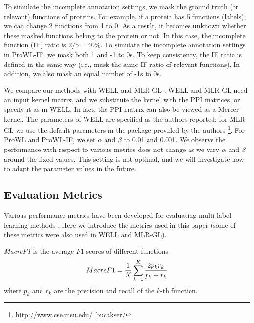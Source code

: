 \documentclass{llncs} %
\begin{document}
To simulate the incomplete annotation settings, we mask the ground truth (or relevant) functions of proteins. For example, if a protein has 5 functions (labels), we can change
2 functions from 1 to 0. As a result, it becomes unknown  whether these masked functions belong to the protein or not. In this case, the incomplete function (IF) ratio is $2/5=40\%$. To
simulate the incomplete annotation settings in ProWL-IF, we mask both 1 and -1 to 0s. To keep consistency, the IF ratio is defined in the same way (i.e., mask the
same IF ratio of relevant functions). In addition, we also mask an equal number of -1s to 0s.

We compare our methods with WELL \cite{sun2010multi} and MLR-GL \cite{bucak2011multi}.  WELL and MLR-GL  need an input kernel matrix, and
we substitute the kernel with the PPI matrices, or specify it as in WELL\cite{sun2010multi}. In fact, the
PPI matrix can also be viewed as a Mercer kernel. The parameters of WELL are specified as the authors reported; for MLR-GL we use the default parameters in the package provided
by the authors \footnote{\href{http://www.cse.msu.edu/~bucakser/}{http://www.cse.msu.edu/~bucakser/}}. For ProWL and ProWL-IF, we set
$\alpha$ and $\beta$ to 0.01 and 0.001. We observe the performance with respect to various metrics does not change as we vary $\alpha$ and $\beta$ around the fixed values. This
setting is not optimal, and we will investigate how to adapt the parameter values in the future.

\subsection{Evaluation Metrics}
Various performance metrics have been developed for evaluating  multi-label learning methods \cite{tsoumakas2010mining}. Here we introduce
the metrics used in this paper (some of these metrics were also used in WELL and MLR-GL).

\emph{MacroF1} is the average $F1$ scores of different functions:
\begin{displaymath}
\scriptsize
MacroF1=\frac{1}{K}\sum_{k=1}^{K}\frac{2p_k r_k}{p_k+r_k}
\end{displaymath}
where $p_k$ and $r_k$ are the precision and recall of the $k$-th function.
\begin{comment}
 and specified as:
\begin{displaymath}
p_k=\frac{TP_k}{TP_k+ FP_k} \quad
r_k=\frac{TP_k}{TP_k+ FN_k}
\end{displaymath}
where $TP_k$, $FP_k$ and $FN_k$ are the true positive, false positive and false negative with respect to the $k$-th function.
\end{comment}
\end{document}
